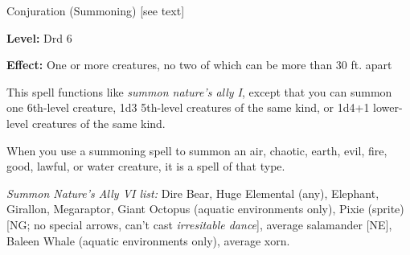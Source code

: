 
Conjuration (Summoning) [see text]

\textbf{Level:} Drd 6

\textbf{Effect:} One or more creatures, no two of which can be more than 30 ft. 
apart

This spell functions like \textit{summon nature's ally I}, except that you can 
summon one 6th-level creature, 1d3 5th-level creatures of the same kind, or 1d4+1 
lower-level creatures of the same kind.

When you use a summoning spell to summon an air, chaotic, earth, evil, fire, good, 
lawful, or water creature, it is a spell of that type.

\textit{Summon Nature's Ally VI list:} Dire Bear, Huge Elemental (any), Elephant, Girallon, Megaraptor, Giant Octopus (aquatic environments only), Pixie (sprite) [NG; no special arrows, can't cast \textit{irresitable dance}], average salamander [NE], Baleen Whale (aquatic environments only), average xorn.
